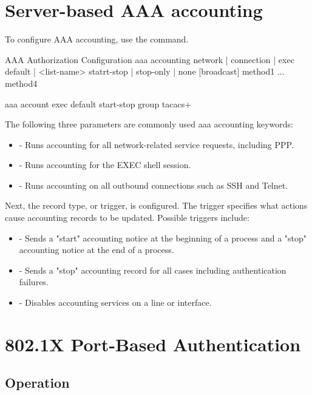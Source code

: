 \section{Server-based AAA accounting}

To configure AAA accounting, use the  command. 

\begin{sexylisting}{AAA Authorization Configuration}
aaa accounting {network | connection | exec} {default | <list-name>} 
         {statrt-stop | stop-only | none} [broadcast] method1 ... method4

aaa account exec default start-stop group tacacs+
\end{sexylisting}

The following three parameters are commonly used aaa accounting keywords:

\begin{itemize}
\item {} - Runs accounting for all network-related service requests, including PPP.
\item {} - Runs accounting for the EXEC shell session.
\item {} - Runs accounting on all outbound connections such as SSH and Telnet.
\end{itemize}

Next, the record type, or trigger, is configured. The trigger specifies what actions cause accounting records to be updated. Possible triggers include:

\begin{itemize}
\item {} - Sends a "start" accounting notice at the beginning of a process and a "stop" accounting notice at the end of a process.
\item {} - Sends a "stop" accounting record for all cases including authentication failures.
\item {} - Disables accounting services on a line or interface.
\end{itemize}
    

\section{802.1X Port-Based Authentication}

\subsection{Operation}

